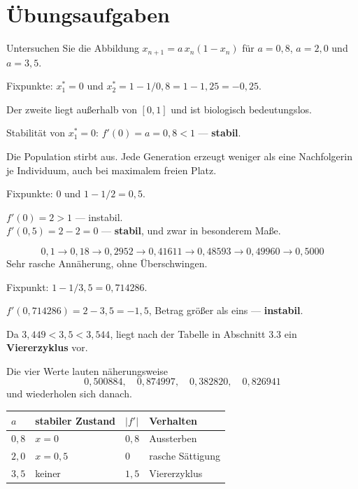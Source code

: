 \section{Übungsaufgaben}

\begin{aufgabe}
Untersuchen Sie die Abbildung $x_{n+1} = a\,x_n(1-x_n)$ für $a = 0{,}8$, $a = 2{,}0$ und $a = 3{,}5$.

\loesung
{}
Fixpunkte: $x^{*}_1 = 0$ und $x^{*}_2 = 1 - 1/0{,}8 = 1 - 1{,}25 = -0{,}25$.

Der zweite liegt außerhalb von $[0,1]$ und ist biologisch bedeutungslos.

Stabilität von $x^{*}_1 = 0$: $f'(0) = a = 0{,}8 < 1$ --- \textbf{stabil}.

 Die Population stirbt aus. Jede Generation erzeugt weniger als eine Nachfolgerin je Individuum, auch bei maximalem freien Platz.

Fixpunkte: $0$ und $1 - 1/2 = 0{,}5$.

$f'(0) = 2 > 1$ --- instabil.\\
$f'(0{,}5) = 2 - 2 = 0$ --- \textbf{stabil}, und zwar in besonderem Maße.

\[ 0{,}1 \to 0{,}18 \to 0{,}2952 \to 0{,}41611 \to 0{,}48593 \to 0{,}49960 \to 0{,}5000 \]
Sehr rasche Annäherung, ohne Überschwingen.

\begin{center}
\begin{minipage}{0.86\textwidth}
\end{minipage}
\end{center}

Fixpunkt: $1 - 1/3{,}5 = 0{,}714286$.

$f'(0{,}714286) = 2 - 3{,}5 = -1{,}5$, Betrag größer als eins --- \textbf{instabil}.

Da $3{,}449 < 3{,}5 < 3{,}544$, liegt nach der Tabelle in Abschnitt 3.3 ein \textbf{Viererzyklus} vor.

 Die vier Werte lauten näherungsweise
\[ 0{,}500884,\quad 0{,}874997,\quad 0{,}382820,\quad 0{,}826941 \]
und wiederholen sich danach.

\begin{center}
\renewcommand{\arraystretch}{1.48}
\begin{tabular}{@{}P{1.4cm}P{2.4cm}P{2.0cm}P{2.4cm}@{}}
\toprule
$a$ & \textbf{stabiler Zustand} & $|f'|$ & \textbf{Verhalten}\\
\midrule
$0{,}8$ & $x=0$ & $0{,}8$ & Aussterben\\
$2{,}0$ & $x=0{,}5$ & $0$ & rasche Sättigung\\
$3{,}5$ & \textcolor{akzent}{keiner} & $1{,}5$ & Viererzyklus\\
\bottomrule
\end{tabular}
\end{center}
\end{aufgabe}

